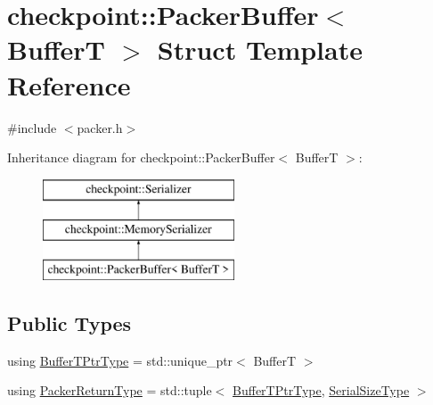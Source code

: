 \hypertarget{structcheckpoint_1_1_packer_buffer}{}\section{checkpoint\+:\+:Packer\+Buffer$<$ BufferT $>$ Struct Template Reference}
\label{structcheckpoint_1_1_packer_buffer}


{\ttfamily \#include $<$packer.\+h$>$}

Inheritance diagram for checkpoint\+:\+:Packer\+Buffer$<$ BufferT $>$\+:\begin{figure}[H]
\begin{center}
\leavevmode
\includegraphics[height=3.000000cm]{structcheckpoint_1_1_packer_buffer}
\end{center}
\end{figure}
\subsection*{Public Types}
\begin{DoxyCompactItemize}
\item 
using \hyperlink{structcheckpoint_1_1_packer_buffer_a081ec628050e8b173e413271fa070c26}{Buffer\+T\+Ptr\+Type} = std\+::unique\+\_\+ptr$<$ BufferT $>$
\item 
using \hyperlink{structcheckpoint_1_1_packer_buffer_ad7b75618e01af437ab75a4099c2cf696}{Packer\+Return\+Type} = std\+::tuple$<$ \hyperlink{structcheckpoint_1_1_packer_buffer_a081ec628050e8b173e413271fa070c26}{Buffer\+T\+Ptr\+Type}, \hyperlink{namespacecheckpoint_a083f6674da3f94c2901b18c6d238217c}{Serial\+Size\+Type} $>$
\end{DoxyCompactItemize}
